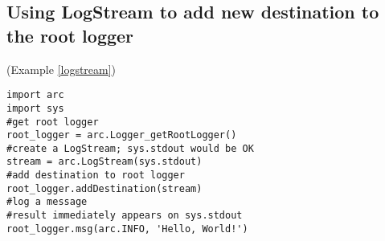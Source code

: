 \subsection{Using LogStream to add new destination to the root logger}
(Example \ref{logstream})
\label{clogstream}
\begin{verbatim}
import arc
import sys
#get root logger
root_logger = arc.Logger_getRootLogger()
#create a LogStream; sys.stdout would be OK
stream = arc.LogStream(sys.stdout)
#add destination to root logger
root_logger.addDestination(stream)
#log a message
#result immediately appears on sys.stdout
root_logger.msg(arc.INFO, 'Hello, World!')
\end{verbatim}

